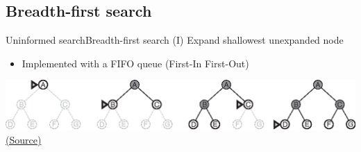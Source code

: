 \documentclass[10pt,compress]{beamer} %
\begin{document}


\subsection{Breadth-first search}

\begin{frame}{Uninformed search}{Breadth-first search (I)}
      Expand shallowest unexpanded node
      \begin{itemize}
        \item Implemented with a FIFO queue (First-In First-Out)
      \end{itemize}

      \bigskip 

      \begin{center}
          \includegraphics[width=\linewidth]{figs/bfs-progress.eps}\\
          \tiny{\href{http://aima.cs.berkeley.edu/index.html}{(Source)}}
      \end{center}
\end{frame}
\end{document}
